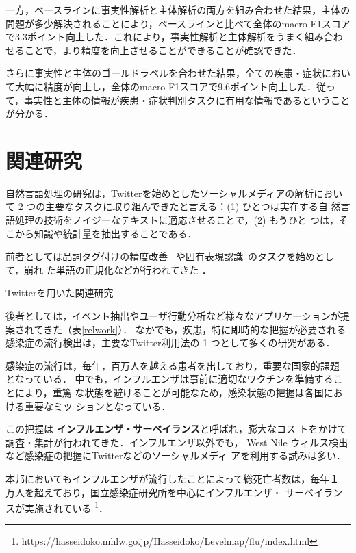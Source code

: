 \documentclass[japanese]{jnlp_1.4}
\begin{document}
一方，ベースラインに事実性解析と主体解析の両方を組み合わせた結果，主体の問題が多少解決されることにより，ベースラインと比べて全体のmacro F1スコアで3.3ポイント向上した．これにより，事実性解析と主体解析をうまく組み合わせることで，より精度を向上させることができることが確認できた．

さらに事実性と主体のゴールドラベルを合わせた結果，全ての疾患・症状において大幅に精度が向上し，全体のmacro
F1スコアで9.6ポイント向上した．従って，事実性と主体の情報が疾患・症状判別タスクに有用な情報であるということが分かる．



\section{関連研究}
\label{sec:relatedworks}

自然言語処理の研究は，Twitterを始めとしたソーシャルメディアの解析におい
て 2 つの主要なタスクに取り組んできたと言える：(1) ひとつは実在する自
然言語処理の技術をノイジーなテキストに適応させることで，(2) もうひと
つは，そこから知識や統計量を抽出することである．

前者としては品詞タグ付けの精度改善~\cite{gimpel-EtAl:2011:ACL-HLT2011}
や固有表現認識~\cite{plank-EtAl:2014:Coling}のタスクを始めとして，崩れ
た単語の正規化などが行われてきた
\cite{han-baldwin:2011:ACL-HLT2011,chrupala:2014:P14-2}．

\begin{table}[t]
\caption{Twitterを用いた関連研究}
\label{relwork}

\end{table}

後者としては，イベント抽出やユーザ行動分析など様々なアプリケーションが提案されてきた（表\ref{relwork}）．
なかでも，疾患，特に即時的な把握が必要される感染症の流行検出は，主要なTwitter利用法の 1 つとして多くの研究がある．


感染症の流行は，毎年，百万人を越える患者を出しており，重要な国家的課題
となっている\cite{国立感染症研究所2006}．
中でも，インフルエンザは事前に適切なワクチンを準備することにより，重篤
な状態を避けることが可能なため，感染状態の把握は各国における重要なミッ
ションとなっている\cite{Ferguson2005}．

この把握は\textbf{ インフルエンザ・サーベイランス}と呼ばれ，膨大なコス
トをかけて調査・集計が行われてきた．インフルエンザ以外でも， West Nile
ウィルス検出 \cite{sugumaran2012real}など感染症の把握にTwitterなどのソーシャルメディ
アを利用する試みは多い．

本邦においてもインフルエンザが流行したことによって総死亡者数は，毎年１
万人を超えており\cite{大日2003}，国立感染症研究所を中心にインフルエンザ・
サーベイランスが実施されている
\footnote{https://hasseidoko.mhlw.go.jp/Hasseidoko/Levelmap/flu/index.html}．
\end{document}
